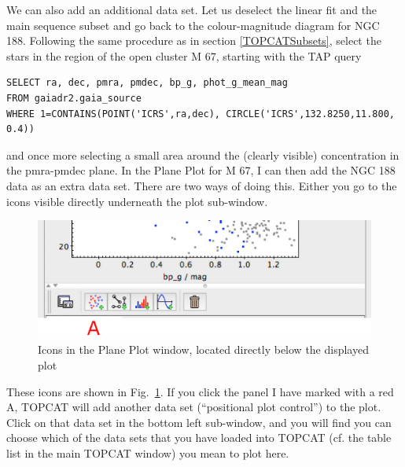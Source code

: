 \documentclass[twocolumn,apj]{openjournal}
\begin{document}
We can also add an additional data set. Let us deselect the linear fit and the main sequence subset and go back to the colour-magnitude diagram for NGC 188. Following the same procedure as in section \ref{TOPCATSubsets}, select the stars in the region of the open cluster M 67, starting with the TAP query
\begin{lstlisting}
SELECT ra, dec, pmra, pmdec, bp_g, phot_g_mean_mag
FROM gaiadr2.gaia_source
WHERE 1=CONTAINS(POINT('ICRS',ra,dec), CIRCLE('ICRS',132.8250,11.800, 0.4))
\end{lstlisting}
and once more selecting a small area around the (clearly visible) concentration in the pmra-pmdec plane. In the Plane Plot for M 67, I can then add the NGC 188 data as an extra data set. There are two ways of doing this. Either you go to the icons visible directly underneath the plot sub-window. 
\begin{figure}[htbp]
\begin{center}
\includegraphics[width=\linewidth]{plotIcons.jpg}
\caption{Icons in the Plane Plot window, located directly below the displayed plot}
\label{PlotIcons}
\end{center}
\end{figure}
These icons are shown in Fig.~\ref{PlotIcons}. If you click the panel I have marked with a red A, TOPCAT will add another data set (``positional plot control'') to the plot. Click on that data set in the bottom left sub-window, and you will find you can choose which of the data sets that you have loaded into TOPCAT (cf. the table list in the main TOPCAT window) you mean to plot here. 
\end{document}
